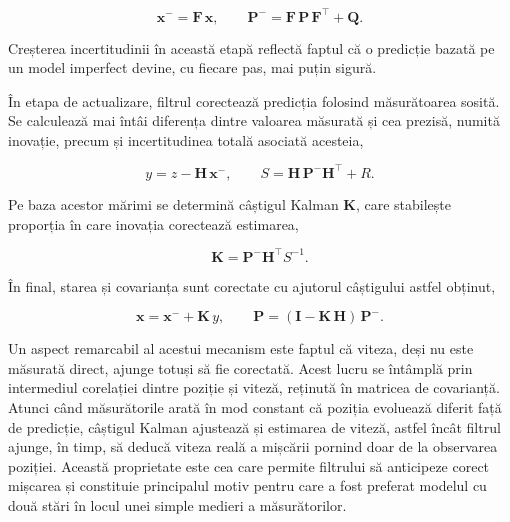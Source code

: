 \begin{equation}
\label{eq:kalman-predict}
\mathbf{x}^{-} = \mathbf{F}\,\mathbf{x} , \qquad
\mathbf{P}^{-} = \mathbf{F}\,\mathbf{P}\,\mathbf{F}^{\top} + \mathbf{Q} .
\end{equation}

Creșterea incertitudinii în această etapă reflectă faptul că o predicție bazată pe
un model imperfect devine, cu fiecare pas, mai puțin sigură.

În etapa de actualizare, filtrul corectează predicția folosind măsurătoarea sosită.
Se calculează mai întâi diferența dintre valoarea măsurată și cea prezisă, numită
inovație, precum și incertitudinea totală asociată acesteia,

\begin{equation}
\label{eq:kalman-innov}
y = z - \mathbf{H}\,\mathbf{x}^{-} , \qquad
S = \mathbf{H}\,\mathbf{P}^{-}\mathbf{H}^{\top} + R .
\end{equation}

Pe baza acestor mărimi se determină câștigul Kalman $\mathbf{K}$, care stabilește
proporția în care inovația corectează estimarea,

\begin{equation}
\label{eq:kalman-gain}
\mathbf{K} = \mathbf{P}^{-}\mathbf{H}^{\top} S^{-1} .
\end{equation}

În final, starea și covarianța sunt corectate cu ajutorul câștigului astfel
obținut,

\begin{equation}
\label{eq:kalman-update}
\mathbf{x} = \mathbf{x}^{-} + \mathbf{K}\,y , \qquad
\mathbf{P} = (\mathbf{I} - \mathbf{K}\,\mathbf{H})\,\mathbf{P}^{-} .
\end{equation}

Un aspect remarcabil al acestui mecanism este faptul că viteza, deși nu este
măsurată direct, ajunge totuși să fie corectată. Acest lucru se întâmplă prin
intermediul corelației dintre poziție și viteză, reținută în matricea de
covarianță. Atunci când măsurătorile arată în mod constant că poziția evoluează
diferit față de predicție, câștigul Kalman ajustează și estimarea de viteză, astfel
încât filtrul ajunge, în timp, să deducă viteza reală a mișcării pornind doar de la
observarea poziției. Această proprietate este cea care permite filtrului să
anticipeze corect mișcarea și constituie principalul motiv pentru care a fost
preferat modelul cu două stări în locul unei simple medieri a măsurătorilor.

